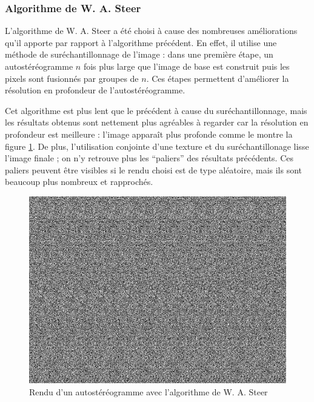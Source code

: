   \subsubsection{Algorithme de W. A. Steer}
  
  L'algorithme de W. A. Steer a été choisi à cause des nombreuses améliorations qu'il apporte par rapport à l'algorithme précédent. En effet, il utilise une méthode de suréchantillonnage de l'image : dans une première étape, un autostéréogramme $n$ fois plus large que l'image de base est construit puis les pixels sont fusionnés par groupes de $n$. Ces étapes permettent d'améliorer la résolution en profondeur de l'autostéréogramme.
  
  Cet algorithme est plus lent que le précédent à cause du suréchantillonnage, mais les résultats obtenus sont nettement plus agréables à regarder car la résolution en profondeur est meilleure : l'image apparaît plus profonde comme le montre la figure \ref{fig:autoste2}. De plus, l'utilisation conjointe d'une texture et du suréchantillonage lisse l'image finale ; on n'y retrouve plus les ``paliers'' des résultats précédents. Ces paliers peuvent être visibles si le rendu choisi est de type aléatoire, mais ils sont beaucoup plus nombreux et rapprochés.

\begin{figure}[h]
	\centering
	\includegraphics[scale=0.3]{autoste2.png}
	\caption{\label{fig:autoste2} Rendu d'un autostéréogramme avec l'algorithme de W. A. Steer \protect}
\end{figure}
